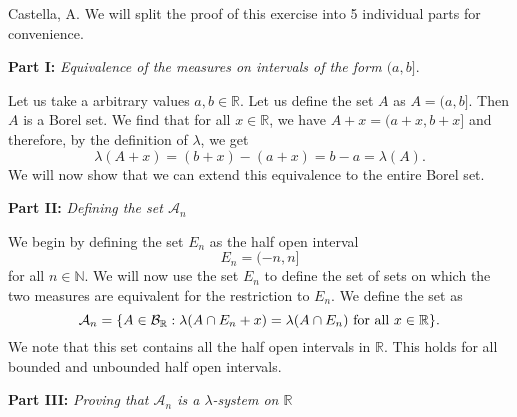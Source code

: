 \begin{solution}[3.19]{Castella, A.}
    We will split the proof of this exercise into 5 individual parts for convenience.
    \vspace{0.5\baselineskip}

    \noindent\textbf{Part I:} \textit{Equivalence of the measures on intervals of the form $(a,b]$}.
    
    Let us take a arbitrary values $a,b \in \mathbb{R}$. Let us define the set $A$ as $A = (a,b]$. Then $A$ is a Borel set. We find that for all $x\in\mathbb{R}$, we have $A + x = (a+x,b+x]$ and therefore, by the definition of $\lambda$, we get 
    $$
        \lambda(A+x) = (b+x)-(a+x) = b - a = \lambda(A).
    $$
    We will now show that we can extend this equivalence to the entire Borel set.    
    \vspace{0.5\baselineskip}
    
    \noindent\textbf{Part II:} \textit{Defining the set $\mathcal{A}_n$}
    
    We begin by defining the set $E_n$ as the half open interval
    $$
        E_n = (-n,n]
    $$
    for all $n \in \mathbb{N}$. We will now use the set $E_n$ to define the set of sets on which the two measures are equivalent for the restriction to $E_n$. We define the set as
    $$
        \mathcal{A}_n = \{A\in\mathcal B_{\mathbb R} : \lambda(A\cap E_n + x) = \lambda(A\cap E_n) \text{ for all }x\in\mathbb{R}\}.
    $$
    We note that this set contains all the half open intervals in $\mathbb{R}$. This holds for all bounded and unbounded half open intervals.
    \vspace{0.5\baselineskip}
    
    \noindent\textbf{Part III:} \textit{Proving that $\mathcal{A}_n$ is a $\lambda$-system on $\mathbb{R}$}
    

\end{solution}
